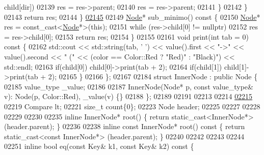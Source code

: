 \begin{DoxyCode}
      child[dir])
02139                         res = res->parent;
02140                     res = res->parent;
02141                 \}
02142             \}
02143             \textcolor{keywordflow}{return} res;
02144         \}
\hypertarget{map_8h_source_l02145}{}\hyperlink{structaed2_1_1map_1_1Node_ae3420a3dca910d193089461151b8dc4e_ae3420a3dca910d193089461151b8dc4e}{02145} 
02149         \hyperlink{structaed2_1_1map_1_1Node}{Node}* sub\_minimo()\textcolor{keyword}{ const }\{
02150             \hyperlink{structaed2_1_1map_1_1Node}{Node}* res = \textcolor{keyword}{const\_cast<}\hyperlink{structaed2_1_1map_1_1Node}{Node}*\textcolor{keyword}{>}(\textcolor{keyword}{this});
02151             \textcolor{keywordflow}{while} (res->child[0] != \textcolor{keyword}{nullptr})
02152                 res = res->child[0];
02153             \textcolor{keywordflow}{return} res;
02154         \}
02155 
02161         \textcolor{keywordtype}{void} print(\textcolor{keywordtype}{int} tab = 0)\textcolor{keyword}{ const }\{
02162             std::cout << std::string(tab, \textcolor{charliteral}{' '}) << value().first << \textcolor{stringliteral}{"->"} << 
      value().second << \textcolor{stringliteral}{"   ("} << (color == Color::Red ? \textcolor{stringliteral}{"Red)"} : \textcolor{stringliteral}{"Black)"}) << std::endl;
02163             \textcolor{keywordflow}{if}(child[0]) child[0]->print(tab + 2);
02164             \textcolor{keywordflow}{if}(child[1]) child[1]->print(tab + 2);
02165         \}
02166     \};
02167 
02184     \textcolor{keyword}{struct }InnerNode : \textcolor{keyword}{public} Node \{
02185         value\_type \_value;
02186 
02187         InnerNode(Node* p, \textcolor{keyword}{const} value\_type& v): Node(p, Color::Red), \_value(v)
       \{\}
02188     \};
02189 
02191 
02213 
02214 
\hypertarget{map_8h_source_l02215}{}\hyperlink{classaed2_1_1map_a0e5be36fae0693e4665bd2a615e7550a_a0e5be36fae0693e4665bd2a615e7550a}{02215} 
02219     Compare lt;
02221     \textcolor{keywordtype}{size\_t} count\{0\};
02223     Node header;
02225 
02227 
02228 
02229 
02230 
02235     \textcolor{keyword}{inline} InnerNode* root() \{ \textcolor{keywordflow}{return} \textcolor{keyword}{static\_cast<}InnerNode*\textcolor{keyword}{>}(header.parent); \}
02236 
02238     \textcolor{keyword}{inline} \textcolor{keyword}{const} InnerNode* root()\textcolor{keyword}{ const }\{ \textcolor{keywordflow}{return} \textcolor{keyword}{static\_cast<}\textcolor{keyword}{const }InnerNode*\textcolor{keyword}{>}
      (header.parent); \}
02240 
02242 
02243 
02244 
02251     \textcolor{keyword}{inline} \textcolor{keywordtype}{bool} eq(\textcolor{keyword}{const} Key& k1, \textcolor{keyword}{const} Key& k2)\textcolor{keyword}{ const }\{

\end{DoxyCode}
